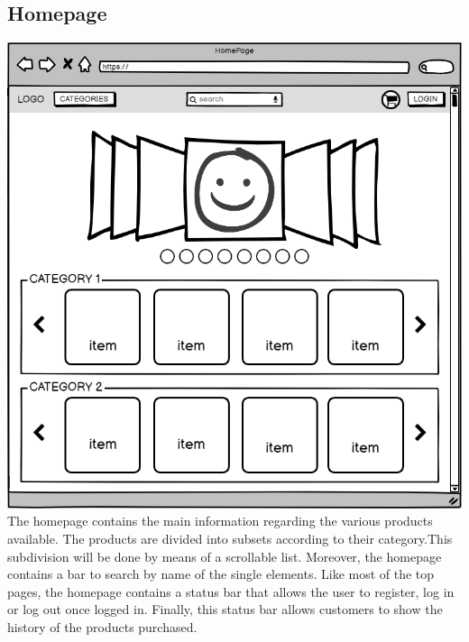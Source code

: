 \subsection{Homepage}
    \includegraphics[width=\textwidth,height=\textheight,keepaspectratio]{mockups/homepageMockup.png}
\\
The homepage contains the main information regarding the various products available.
The products are divided into subsets according to their category.This subdivision will be done by means of a scrollable list. Moreover, the homepage contains a bar to search by name of the single elements.
Like most of the top pages, the homepage contains a status bar that allows the user to register, log in or log out once logged in.
Finally, this status bar allows customers to show the history of the products purchased.

